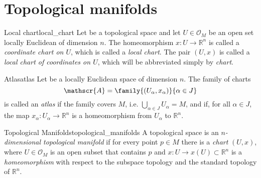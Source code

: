 \section{Topological manifolds}

\begin{definition}{Local chart}{local_chart}
    Let  be a topological space and let \(U \in\mathcal{O}_M\) be an open set locally Euclidean of dimension \(n\). The homeomorphism \(x : U \to \mathbb{R}^n\) is called a \emph{coordinate chart on \(U\)}, which is called a \emph{local chart}. The pair \((U, x)\) is called a \emph{local chart of coordinates on \(U\)}, which will be abbreviated simply by \emph{chart}.
\end{definition}

\begin{definition}{Atlas}{atlas}
    Let  be a locally Euclidean space of dimension \(n\). The family of charts
    \begin{equation*}
        \mathscr{A} = \family{(U_\alpha, x_\alpha)}{\alpha \in J}
    \end{equation*}
    is called an \emph{atlas} if the family  covers \(M\), i.e. \(\bigcup_{\alpha \in J} U_\alpha = M\), and if, for all \(\alpha \in J\), the map \(x_\alpha : U_\alpha \to \mathbb{R}^n\) is a homeomorphism from \(U_\alpha\) to \(\mathbb{R}^n\).
\end{definition}

\begin{definition}{Topological Manifolds}{topological_manifolds}
    A topological space  is an \emph{\(n\)-dimensional topological manifold} if for every point \(p \in M\) there is a \emph{chart} \((U, x)\), where \(U\in\mathcal{O}_M\) is an open subset that contains \(p\) and \(x : U \to x(U) \subset \mathbb{R}^n\) is a \emph{homeomorphism} with respect to the subspace topology and the standard topology of \(\mathbb{R}^n\).
\end{definition}
